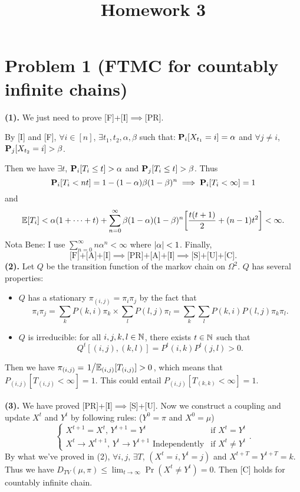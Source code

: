 \documentclass{article}
\begin{document}
\title{\vspace{-1.5cm}Homework 3}
\maketitle
\section*{Problem 1 (FTMC for countably infinite chains)}

\textbf{(1).}
We just need to prove [F]+[I]$\implies$[PR].

By [I] and [F], $\forall i\in[n]$, $\exists t_1,t_2,\alpha,\beta$ such that: $\P_i[X_{t_1}=i]=\alpha$ and $\forall j\ne i$, $\P_j[X_{t_2}=i]>\beta$.

Then we have $\exists t$, $\P_i[T_i\le t]>\alpha$ and $\P_j[T_i\le t]>\beta$. Thus
\[
	\P_i[T_i<nt] = 1-(1-\alpha)\beta(1-\beta)^n \implies \P_i[T_i<\infty] = 1
\] and
\[
	\=E[T_i]<\alpha(1+\cdots+t)+\sum_{n=0}^\infty\beta(1-\alpha)(1-\beta)^n\qty[\frac{t(t+1)}{2}+(n-1)t^2]<\infty
	.\] Nota Bene: I use $\sum_{n=0}^\infty n\alpha^n<\infty$ where $\abs{\alpha}<1$.
Finally,
\[
	\text{[F]+[A]+[I]}\implies\text{[PR]+[A]+[I]}\implies\text{[S]+[U]+[C]}
	.\]
\textbf{(2).} Let $Q$ be the transition function of the markov chain on $\Omega^2$. $Q$ has several properties:
\begin{itemize}
	\item
	      $Q$ has a stationary  $\pi_{(i,j)}=\pi_i\pi_j$ by the fact that
	      \[
		      \pi_i\pi_j
		      =
		      \sum_kP(k,i)\pi_k\times\sum_lP(l,j)\pi_l
		      =
		      \sum_k\sum_lP(k,i)P(l,j)\pi_k\pi_l
		      .\]
	\item
	      $Q$ is irreducible: for all $i,j,k,l\in\NN$, there exists $t\in\NN$ such that
	      \[
		      Q^t[(i,j),(k,l)]=P^t(i,k)P^t(j,l)>0
		      .\]
\end{itemize}
Then we have $\pi_{(i,j)}=\flatfrac{1}{\=E_{(i,j)}[T_{(i,j)}]>0}$, which means that $P_{(i,j)}[T_{(i,j)}<\infty]=1$. This could entail $P_{(i,j)}[T_{(k,k)}<\infty]=1$.
\\\\
\textbf{(3).}
We have proved [PR]+[I]$\implies$[S]+[U]. Now we construct a coupling and update $X^t$ and  $Y^t$ by following rules: ($Y^0=\pi$ and $X^0=\mu$)
\[
	\begin{cases}
		X^{t+1}=X^t,\,Y^{t+1}=Y^t                                & \text{if }X^t=Y^t
		\\
		X^{t}\to X^{t+1},\,Y^{t}\to Y^{t+1}\text{ Independently} & \text{if }X^t\ne Y^t
	\end{cases}
	.\]
By what we've proved in (2), $\forall i,j$, $\exists T$, $(X^t=i,Y^t=j)$ and $X^{t+T}=Y^{t+T}=k$. Thus we have $D_{TV}(\mu,\pi)\le \lim_{t\to\infty}\Pr(X^t\ne Y^t)=0$.
Then [C] holds for countably infinite chain.
\end{document}
